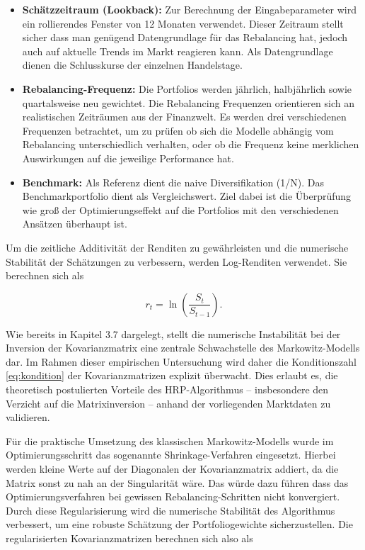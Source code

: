 \documentclass[parskip=half]{scrartcl}
\begin{document}
	\begin{itemize}
		\item \textbf{Schätzzeitraum (Lookback):} Zur Berechnung der Eingabeparameter wird ein rollierendes Fenster von 12 Monaten verwendet. Dieser Zeitraum stellt sicher dass man genügend Datengrundlage für das Rebalancing hat, jedoch auch auf aktuelle Trends im Markt reagieren kann. Als Datengrundlage dienen die Schlusskurse der einzelnen Handelstage.
		\item \textbf{Rebalancing-Frequenz:} Die Portfolios werden jährlich, halbjährlich sowie quartalsweise neu gewichtet. Die Rebalancing Frequenzen orientieren sich an realistischen Zeiträumen aus der Finanzwelt. Es werden drei verschiedenen Frequenzen betrachtet, um zu prüfen ob sich die Modelle abhängig vom Rebalancing unterschiedlich verhalten, oder ob die Frequenz keine merklichen Auswirkungen auf die jeweilige Performance hat.
		\item \textbf{Benchmark:} Als Referenz dient die naive Diversifikation (1/N). Das Benchmarkportfolio dient als Vergleichswert. Ziel dabei ist die Überprüfung wie groß der Optimierungseffekt auf die Portfolios mit den verschiedenen Ansätzen überhaupt ist. 
	\end{itemize}
	
	\clearpage
	
	Um die zeitliche Additivität der Renditen zu gewährleisten und die numerische Stabilität der Schätzungen zu verbessern, werden Log-Renditen verwendet. Sie berechnen sich als
	
	\begin{equation}
		r_{t} = \ln \left( \frac{S_t}{S_{t-1}} \right) . \label{eq:log_returns}
	\end{equation}
	
	
	
	Wie bereits in Kapitel 3.7 dargelegt, stellt die numerische Instabilität bei der Inversion der Kovarianzmatrix eine zentrale Schwachstelle des Markowitz-Modells dar. Im Rahmen dieser empirischen Untersuchung wird daher die Konditionszahl \eqref{eq:kondition} der Kovarianzmatrizen explizit überwacht. Dies erlaubt es, die theoretisch postulierten Vorteile des HRP-Algorithmus – insbesondere den Verzicht auf die Matrixinversion – anhand der vorliegenden Marktdaten zu validieren.
	
	Für die praktische Umsetzung des klassischen Markowitz-Modells wurde im Optimierungsschritt das sogenannte Shrinkage-Verfahren eingesetzt. Hierbei werden kleine Werte auf der Diagonalen der Kovarianzmatrix addiert, da die Matrix sonst zu nah an der Singularität wäre. Das würde dazu führen dass das Optimierungsverfahren bei gewissen Rebalancing-Schritten nicht konvergiert. Durch diese Regularisierung wird die numerische Stabilität des Algorithmus verbessert, um eine robuste Schätzung der Portfoliogewichte sicherzustellen.
	Die regularisierten Kovarianzmatrizen berechnen sich also als
	
\end{document}
